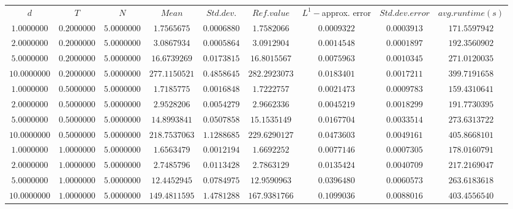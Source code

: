 \begin{tabular}{ccccccccc}
$d$ & $T$ & $N$ & $Mean$ & $Std. dev.$ & $Ref. value$ & $L^1-$approx. error & $Std. dev. error$ & $avg. runtime (s)$\\
$1.0000000$ & $0.2000000$ & $5.0000000$ & $1.7565675$ & $0.0006880$ & $1.7582066$ & $0.0009322$ & $0.0003913$ & $171.5597942$\\
$2.0000000$ & $0.2000000$ & $5.0000000$ & $3.0867934$ & $0.0005864$ & $3.0912904$ & $0.0014548$ & $0.0001897$ & $192.3560902$\\
$5.0000000$ & $0.2000000$ & $5.0000000$ & $16.6739269$ & $0.0173815$ & $16.8015567$ & $0.0075963$ & $0.0010345$ & $271.0120035$\\
$10.0000000$ & $0.2000000$ & $5.0000000$ & $277.1150521$ & $0.4858645$ & $282.2923073$ & $0.0183401$ & $0.0017211$ & $399.7191658$\\
$1.0000000$ & $0.5000000$ & $5.0000000$ & $1.7185775$ & $0.0016848$ & $1.7222757$ & $0.0021473$ & $0.0009783$ & $159.4310641$\\
$2.0000000$ & $0.5000000$ & $5.0000000$ & $2.9528206$ & $0.0054279$ & $2.9662336$ & $0.0045219$ & $0.0018299$ & $191.7730395$\\
$5.0000000$ & $0.5000000$ & $5.0000000$ & $14.8993841$ & $0.0507858$ & $15.1535149$ & $0.0167704$ & $0.0033514$ & $273.6313722$\\
$10.0000000$ & $0.5000000$ & $5.0000000$ & $218.7537063$ & $1.1288685$ & $229.6290127$ & $0.0473603$ & $0.0049161$ & $405.8668101$\\
$1.0000000$ & $1.0000000$ & $5.0000000$ & $1.6563479$ & $0.0012194$ & $1.6692252$ & $0.0077146$ & $0.0007305$ & $178.0160791$\\
$2.0000000$ & $1.0000000$ & $5.0000000$ & $2.7485796$ & $0.0113428$ & $2.7863129$ & $0.0135424$ & $0.0040709$ & $217.2169047$\\
$5.0000000$ & $1.0000000$ & $5.0000000$ & $12.4452945$ & $0.0784975$ & $12.9590963$ & $0.0396480$ & $0.0060573$ & $263.6183618$\\
$10.0000000$ & $1.0000000$ & $5.0000000$ & $149.4811595$ & $1.4781288$ & $167.9381766$ & $0.1099036$ & $0.0088016$ & $403.4556540$\\
\end{tabular}
